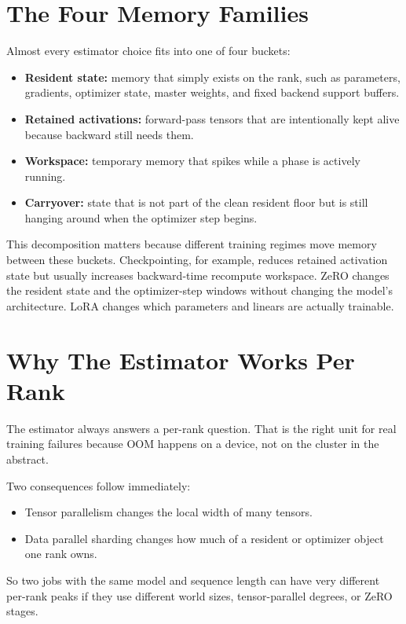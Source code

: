 \section{The Four Memory Families}
Almost every estimator choice fits into one of four buckets:
\begin{itemize}[leftmargin=1.5em]
\item \textbf{Resident state:} memory that simply exists on the rank, such as
parameters, gradients, optimizer state, master weights, and fixed backend
support buffers.
\item \textbf{Retained activations:} forward-pass tensors that are intentionally
kept alive because backward still needs them.
\item \textbf{Workspace:} temporary memory that spikes while a phase is
actively running.
\item \textbf{Carryover:} state that is not part of the clean resident floor
but is still hanging around when the optimizer step begins.
\end{itemize}

This decomposition matters because different training regimes move memory
between these buckets. Checkpointing, for example, reduces retained activation
state but usually increases backward-time recompute workspace. ZeRO changes the
resident state and the optimizer-step windows without changing the model's
architecture. LoRA changes which parameters and linears are actually trainable.

\section{Why The Estimator Works Per Rank}
The estimator always answers a per-rank question. That is the right unit for
real training failures because OOM happens on a device, not on the cluster in
the abstract.

Two consequences follow immediately:
\begin{itemize}[leftmargin=1.5em]
\item Tensor parallelism changes the local width of many tensors.
\item Data parallel sharding changes how much of a resident or optimizer object
one rank owns.
\end{itemize}

So two jobs with the same model and sequence length can have very different
per-rank peaks if they use different world sizes, tensor-parallel degrees, or
ZeRO stages.

